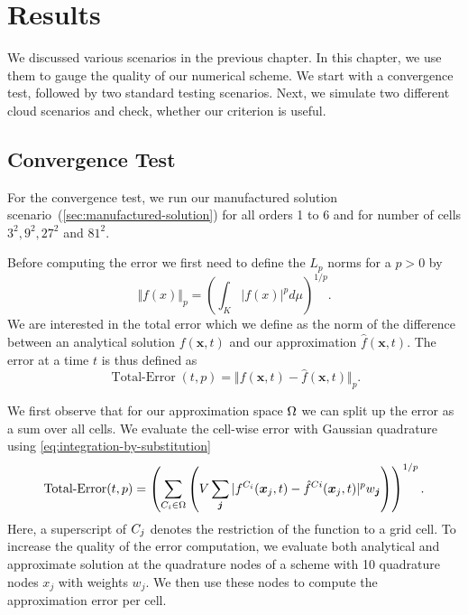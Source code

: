 \chapter{Results}\label{chap:results}
We discussed various scenarios in the previous chapter.
In this chapter, we use them to gauge the quality of our numerical scheme.
We start with a convergence test, followed by two standard testing scenarios.
Next, we simulate two different cloud scenarios and check, whether our \amr{} criterion is useful.

\newcommand{\error}{\operatorname{Total-Error}}
\section{Convergence Test}\label{sec:results-convergence}
For the convergence test, we run our manufactured solution scenario~(\cref{sec:manufactured-solution}) for all orders 1 to 6 and for number of cells $3^2, 9^2, 27^2$ and $81^2 $.

Before computing the error we first need to define the $L_p$ norms for a $p > 0$ by
\begin{equation}
  \label{eq:Lp-nrom}
  \Vert f(x) \Vert_p = \left( \int_K \vert f(x) \vert^p d\mu  \right)^{1/p}.
\end{equation}
We are interested in the total error which we define as the norm of the difference between an analytical solution $f(\bm{x}, t)$ and our approximation $\hat{f}(\bm{x}, t)$.
The error at a time $t$ is thus defined as
\begin{equation}
  \label{eq:error}
  \error(t,p) = \Vert f(\bm{x}, t) - \hat{f}(\bm{x}, t) \Vert_p.
\end{equation}

We first observe that for our approximation space $\broken$ we can split up the error as a sum over all cells.
We evaluate the cell-wise error with Gaussian quadrature using \cref{eq:integration-by-substitution}
 \begin{equation}
   \error(t,p) = 
   \left( \sum_{\cell[i] \in \broken}
    \left( V \sum_{\bm{j}} \vert f^{\cell[i]}(\bm{x}_j, t) - \hat{f}^{\cell{i}}(\bm{x}_j, t) \vert^p w_{{\bm{j}}} \right) \right)^{1/p}.
 \end{equation}
Here, a superscript of $\cell[j]$ denotes the restriction of the function to a grid cell.
To increase the quality of the error computation, we evaluate both analytical and approximate solution at the quadrature nodes of a scheme with 10 quadrature nodes $x_j$ with weights $w_j$.
We then use these nodes to compute the approximation error per cell.

